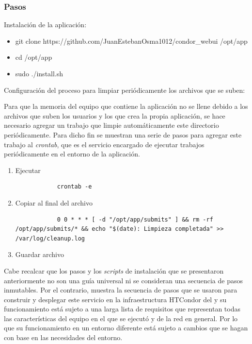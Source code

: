 \subsubsection{Pasos}
\noindent

Instalación de la aplicación:

\begin{itemize}
	\item git clone https://github.com/JuanEstebanOsma1012/condor\_webui /opt/app
	\item cd /opt/app
	\item sudo ./install.sh
\end{itemize}

Configuración del proceso para limpiar periódicamente los archivos que se suben:

Para que la memoria del equipo que contiene la aplicación no se llene debido a los archivos que suben los usuarios y los que crea la propia aplicación, se hace necesario agregar un trabajo que limpie automáticamente este directorio periódicamente. Para dicho fin se muestran una serie de pasos para agregar este trabajo al \textit{crontab}, que es el servicio encargado de ejecutar trabajos periódicamente en el entorno de la aplicación.

\begin{enumerate}
	\item Ejecutar
		\begin{verbatim}
			crontab -e
		\end{verbatim}
	\item Copiar al final del archivo
		\begin{verbatim}
			0 0 * * * [ -d "/opt/app/submits" ] && rm -rf /opt/app/submits/* && echo "$(date): Limpieza completada" >> /var/log/cleanup.log
		\end{verbatim}
	\item Guardar archivo
\end{enumerate}

Cabe recalcar que los pasos y los \textit{scripts} de instalación que se presentaron anteriormente no son una guía universal ni se consideran una secuencia de pasos inmutables. Por el contrario, muestra la secuencia de pasos que se usaron para construir y desplegar este servicio en la infraestructura HTCondor del \GRID y su funcionamiento está sujeto a una larga lista de requisitos que representan todas las características del equipo en el que se ejecutó y de la red en general. Por lo que su funcionamiento en un entorno diferente está sujeto a cambios que se hagan con base en las necesidades del entorno.